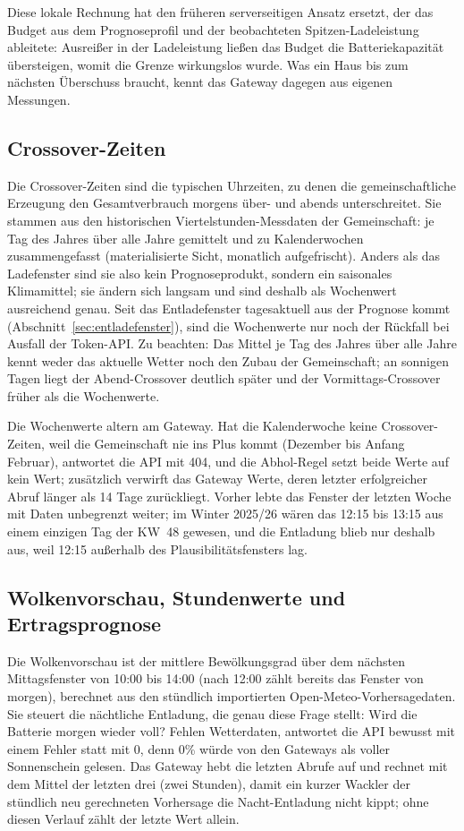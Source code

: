 \documentclass[11pt,a4paper]{article}
\begin{document}
Diese lokale Rechnung hat den früheren serverseitigen Ansatz ersetzt, der
das Budget aus dem Prognoseprofil und der beobachteten Spitzen-Ladeleistung
ableitete: Ausreißer in der Ladeleistung ließen das Budget die
Batteriekapazität übersteigen, womit die Grenze wirkungslos wurde. Was
ein Haus bis zum nächsten Überschuss braucht, kennt das Gateway dagegen
aus eigenen Messungen.

\subsection{Crossover-Zeiten}

Die Crossover-Zeiten sind die typischen Uhrzeiten, zu denen die
gemeinschaftliche Erzeugung den Gesamtverbrauch morgens über- und abends
unterschreitet. Sie stammen aus den historischen Viertelstunden-Messdaten
der Gemeinschaft: je Tag des Jahres über alle Jahre gemittelt und zu
Kalenderwochen zusammengefasst (materialisierte Sicht, monatlich
aufgefrischt). Anders als das Ladefenster sind sie also kein
Prognoseprodukt, sondern ein saisonales Klimamittel; sie ändern sich
langsam und sind deshalb als Wochenwert ausreichend genau. Seit das
Entladefenster tagesaktuell aus der Prognose kommt
(Abschnitt~\ref{sec:entladefenster}), sind die Wochenwerte nur noch der
Rückfall bei Ausfall der Token-API. Zu beachten: Das Mittel je Tag des
Jahres über alle Jahre kennt weder das aktuelle Wetter noch den Zubau der
Gemeinschaft; an sonnigen Tagen liegt der Abend-Crossover deutlich später
und der Vormittags-Crossover früher als die Wochenwerte.

Die Wochenwerte altern am Gateway. Hat die Kalenderwoche keine
Crossover-Zeiten, weil die Gemeinschaft nie ins Plus kommt (Dezember bis
Anfang Februar), antwortet die API mit 404, und die Abhol-Regel setzt
beide Werte auf \glqq kein Wert\grqq{}; zusätzlich verwirft das Gateway
Werte, deren letzter erfolgreicher Abruf länger als 14 Tage zurückliegt.
Vorher lebte das Fenster der letzten Woche mit Daten unbegrenzt weiter;
im Winter 2025/26 wären das 12:15 bis 13:15 aus einem einzigen Tag der
KW~48 gewesen, und die Entladung blieb nur deshalb aus, weil 12:15 außerhalb
des Plausibilitätsfensters lag.

\subsection{Wolkenvorschau, Stundenwerte und Ertragsprognose}\label{sec:wolkenvorschau}

Die Wolkenvorschau ist der mittlere Bewölkungsgrad über dem nächsten
Mittagsfenster von 10:00 bis 14:00 (nach 12:00 zählt bereits das Fenster
von morgen), berechnet aus den stündlich importierten
Open-Meteo-Vorhersagedaten. Sie steuert die nächtliche Entladung, die
genau diese Frage stellt: Wird die Batterie morgen wieder voll? Fehlen
Wetterdaten, antwortet die API bewusst mit einem Fehler statt mit 0, denn
0\% würde von den Gateways als voller Sonnenschein gelesen. Das Gateway
hebt die letzten Abrufe auf und rechnet mit dem Mittel der letzten drei
(zwei Stunden), damit ein kurzer Wackler der stündlich neu gerechneten
Vorhersage die Nacht-Entladung nicht kippt; ohne diesen Verlauf zählt der
letzte Wert allein.
\end{document}
